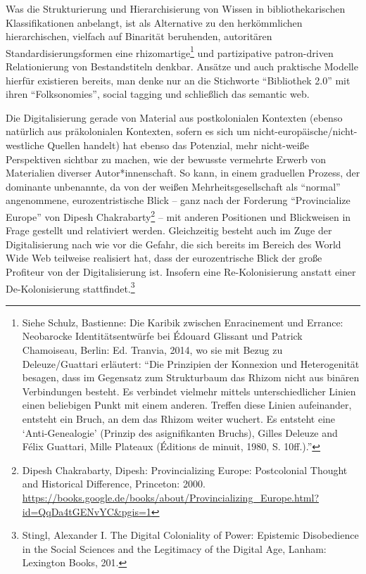 \documentclass[a4paper,
fontsize=11pt,
oneside,
numbers=noperiodatend,
parskip=half-,
bibliography=totoc,
final
]{scrartcl}
\begin{document}
Was die Strukturierung und Hierarchisierung von Wissen in
bibliothekarischen Klassifikationen anbelangt, ist als Alternative zu
den herkömmlichen hierarchischen, vielfach auf Binarität beruhenden,
autoritären Standardisierungsformen eine rhizomartige\footnote{Siehe
  Schulz, Bastienne: Die Karibik zwischen Enracinement und Errance:
  Neobarocke Identitätsentwürfe bei Édouard Glissant und Patrick
  Chamoiseau, Berlin: Ed. Tranvia, 2014, wo sie mit Bezug zu
  Deleuze/Guattari erläutert: \enquote{Die Prinzipien der Konnexion und
  Heterogenität besagen, dass im Gegensatz zum Strukturbaum das Rhizom
  nicht aus binären Verbindungen besteht. Es verbindet vielmehr mittels
  unterschiedlicher Linien einen beliebigen Punkt mit einem anderen.
  Treffen diese Linien aufeinander, entsteht ein Bruch, an dem das
  Rhizom weiter wuchert. Es entsteht eine \enquote*{Anti-Genealogie}
  (Prinzip des asignifikanten Bruchs), Gilles Deleuze and Félix
  Guattari, Mille Plateaux (Éditions de minuit, 1980, S. 10ff.).}} und
partizipative patron-driven Relationierung von Bestandstiteln denkbar.
Ansätze und auch praktische Modelle hierfür existieren bereits, man
denke nur an die Stichworte \enquote{Bibliothek 2.0} mit ihren
\enquote{Folksonomies}, social tagging und schließlich das semantic web.

Die Digitalisierung gerade von Material aus postkolonialen Kontexten
(ebenso natürlich aus präkolonialen Kontexten, sofern es sich um
nicht-europäische/nicht-westliche Quellen handelt) hat ebenso das
Potenzial, mehr nicht-weiße Perspektiven sichtbar zu machen, wie der
bewusste vermehrte Erwerb von Materialien diverser Autor*innenschaft. So
kann, in einem graduellen Prozess, der dominante unbenannte, da von der
weißen Mehrheitsgesellschaft als \enquote{normal} angenommene,
eurozentristische Blick -- ganz nach der Forderung
\enquote{Provincialize Europe} von Dipesh Chakrabarty\footnote{Dipesh
  Chakrabarty, Dipesh: Provincializing Europe: Postcolonial Thought and
  Historical Difference, Princeton: 2000.
  \url{https://books.google.de/books/about/Provincializing_Europe.html?id=QqDa4tGENvYC\&pgis=1}}
-- mit anderen Positionen und Blickweisen in Frage gestellt und
relativiert werden. Gleichzeitig besteht auch im Zuge der
Digitalisierung nach wie vor die Gefahr, die sich bereits im Bereich des
World Wide Web teilweise realisiert hat, dass der eurozentrische Blick
der große Profiteur von der Digitalisierung ist. Insofern eine
Re-Kolonisierung anstatt einer De-Kolonisierung stattfindet.\footnote{Stingl,
  Alexander I. The Digital Coloniality of Power: Epistemic Disobedience
  in the Social Sciences and the Legitimacy of the Digital Age, Lanham:
  Lexington Books, 201.}
\end{document}

